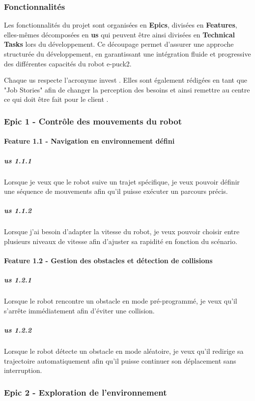 \subsubsection{Fonctionnalités}

Les fonctionnalités du projet sont organisées en \textbf{Epics}, divisées en \textbf{Features}, elles-mêmes décomposées en \textbf{\acrfull{us}} qui peuvent être ainsi divisées en \textbf{Technical Tasks} lors du développement.
Ce découpage permet d’assurer une approche structurée du développement, en garantissant une intégration fluide et progressive des différentes capacités du robot e-puck2.

Chaque \acrshort{us} respecte l'acronyme \acrfull{invest} \autocite{alliance_what_2015}.
Elles sont également rédigées en tant que "Job Stories" afin de changer la perception des besoins et ainsi remettre au centre ce qui doit être fait pour le client \autocite{klement_replacing_2018}.

\subsubsection{Epic 1 - Contrôle des mouvements du robot}

\paragraph{Feature 1.1 - Navigation en environnement défini}
\subparagraph{\acrshort{us} 1.1.1} Lorsque je veux que le robot suive un trajet spécifique, je veux pouvoir définir une séquence de mouvements afin qu'il puisse exécuter un parcours précis.
\subparagraph{\acrshort{us} 1.1.2} Lorsque j’ai besoin d’adapter la vitesse du robot, je veux pouvoir choisir entre plusieurs niveaux de vitesse afin d’ajuster sa rapidité en fonction du scénario.

\paragraph{Feature 1.2 - Gestion des obstacles et détection de collisions}
\subparagraph{\acrshort{us} 1.2.1} Lorsque le robot rencontre un obstacle en mode pré-programmé, je veux qu’il s’arrête immédiatement afin d’éviter une collision.
\subparagraph{\acrshort{us} 1.2.2} Lorsque le robot détecte un obstacle en mode aléatoire, je veux qu’il redirige sa trajectoire automatiquement afin qu’il puisse continuer son déplacement sans interruption.

\subsubsection{Epic 2 - Exploration de l’environnement}

